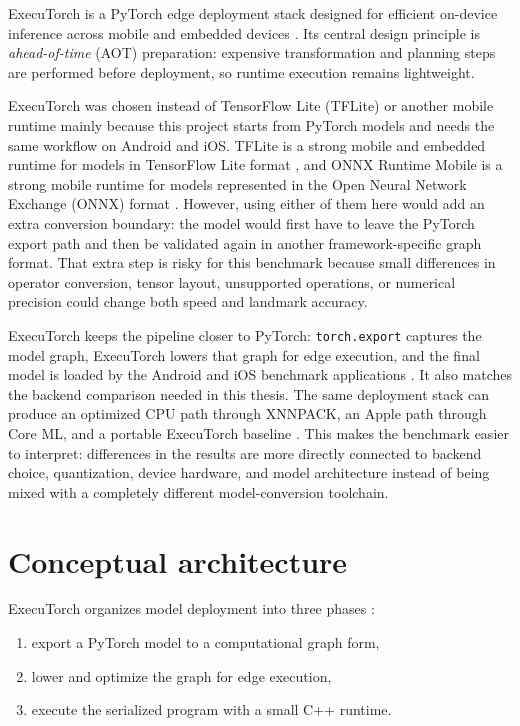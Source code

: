 ExecuTorch is a PyTorch edge deployment stack designed for efficient on-device
inference across mobile and embedded devices
\cite{executorch_how,executorch_arch}. Its central design principle is
\emph{ahead-of-time} (AOT) preparation: expensive transformation and planning
steps are performed before deployment, so runtime execution remains lightweight.

ExecuTorch was chosen instead of TensorFlow Lite (TFLite) or another mobile
runtime mainly because this project starts from PyTorch models and needs the
same workflow on Android and iOS. TFLite is a strong mobile and embedded
runtime for models in TensorFlow Lite format \cite{tensorflow_lite}, and
ONNX Runtime Mobile is a strong mobile runtime for models represented in the
Open Neural Network Exchange (ONNX) format \cite{onnxruntime_mobile}. However,
using either of them here would add an
extra conversion boundary: the model would first have to leave the PyTorch
export path and then be validated again in another framework-specific graph
format. That extra step is risky for this benchmark because small differences in
operator conversion, tensor layout, unsupported operations, or numerical
precision could change both speed and landmark accuracy.

ExecuTorch keeps the pipeline closer to PyTorch: \texttt{torch.export} captures
the model graph, ExecuTorch lowers that graph for edge execution, and the final
model is loaded by the Android and iOS benchmark applications
\cite{pytorch_export,executorch_export,executorch_pte}. It also matches the
backend comparison needed in this thesis. The same deployment stack can produce
an optimized CPU path through XNNPACK, an Apple path through Core ML, and a
portable ExecuTorch baseline
\cite{executorch_xnnpack,executorch_coreml,executorch_how}. This makes the
benchmark easier to interpret: differences in the results are more directly
connected to backend choice, quantization, device hardware, and model
architecture instead of being mixed with a completely different model-conversion
toolchain.

\section{Conceptual architecture}

ExecuTorch organizes model deployment into three phases
\cite{executorch_how,executorch_arch}:
\begin{enumerate}
    \item export a PyTorch model to a computational graph form,
    \item lower and optimize the graph for edge execution,
    \item execute the serialized program with a small C++ runtime.
\end{enumerate}

